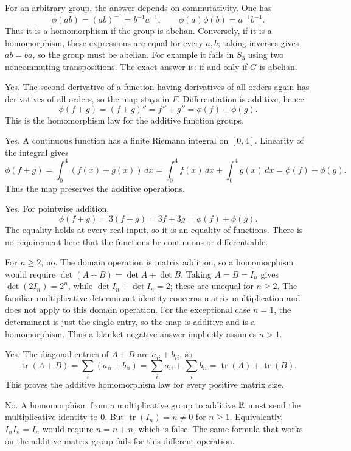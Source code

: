 For an arbitrary group, the answer depends on commutativity. One has
\[\phi(ab)=(ab)^{-1}=b^{-1}a^{-1},\qquad\phi(a)\phi(b)=a^{-1}b^{-1}.\]
Thus it is a homomorphism if the group is abelian. Conversely, if it is a homomorphism, these expressions are equal for every $a,b$; taking inverses gives $ab=ba$, so the group must be abelian. For example it fails in $S_3$ using two noncommuting transpositions. The exact answer is: if and only if $G$ is abelian.

Yes. The second derivative of a function having derivatives of all orders again has derivatives of all orders, so the map stays in $F$. Differentiation is additive, hence
\[\phi(f+g)=(f+g)''=f''+g''=\phi(f)+\phi(g).\]
This is the homomorphism law for the additive function groups.

Yes. A continuous function has a finite Riemann integral on $[0,4]$. Linearity of the integral gives
\[\phi(f+g)=\int_0^4(f(x)+g(x))\,dx=\int_0^4f(x)\,dx+\int_0^4g(x)\,dx=\phi(f)+\phi(g).\]
Thus the map preserves the additive operations.

Yes. For pointwise addition,
\[\phi(f+g)=3(f+g)=3f+3g=\phi(f)+\phi(g).\]
The equality holds at every real input, so it is an equality of functions. There is no requirement here that the functions be continuous or differentiable.

For $n\ge2$, no. The domain operation is matrix addition, so a homomorphism would require $\det(A+B)=\det A+\det B$. Taking $A=B=I_n$ gives $\det(2I_n)=2^n$, while $\det I_n+\det I_n=2$; these are unequal for $n\ge2$. The familiar multiplicative determinant identity concerns matrix multiplication and does not apply to this domain operation.
For the exceptional case $n=1$, the determinant is just the single entry, so the map is additive and is a homomorphism. Thus a blanket negative answer implicitly assumes $n>1$.

Yes. The diagonal entries of $A+B$ are $a_{ii}+b_{ii}$, so
\[\operatorname{tr}(A+B)=\sum_i(a_{ii}+b_{ii})=\sum_i a_{ii}+\sum_i b_{ii}=\operatorname{tr}(A)+\operatorname{tr}(B).\]
This proves the additive homomorphism law for every positive matrix size.

No. A homomorphism from a multiplicative group to additive $\mathbb{R}$ must send the multiplicative identity to $0$. But $\operatorname{tr}(I_n)=n\ne0$ for $n\ge1$. Equivalently, $I_nI_n=I_n$ would require $n=n+n$, which is false. The same formula that works on the additive matrix group fails for this different operation.

